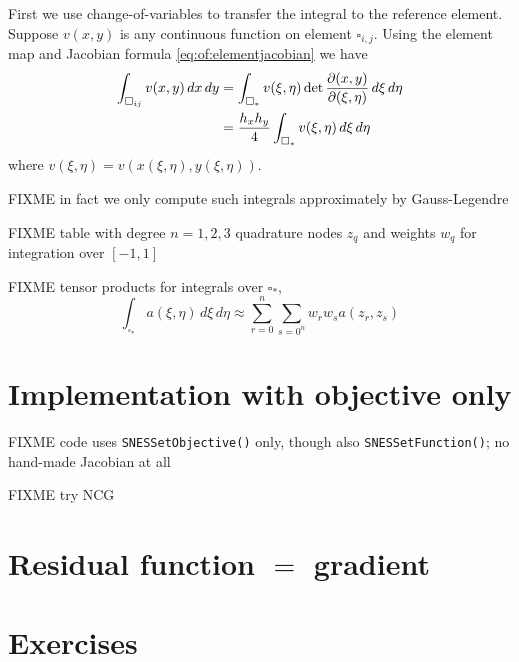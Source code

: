 First we use change-of-variables to transfer the integral to the reference element.  Suppose $v(x,y)$ is any continuous function on element $\square_{i,j}$.  Using the element map and Jacobian formula \eqref{eq:of:elementjacobian} we have
\begin{align}
\int_{\square_{ij}} v(x,y)\,dx\,dy &= \int_{\square_\ast} v(\xi,\eta) \det\frac{\partial(x,y)}{\partial(\xi,\eta)}\,d\xi\,d\eta  \label{eq:of:changeofvars} \\
&= \frac{h_x h_y}{4} \int_{\square_\ast} v(\xi,\eta) \,d\xi\,d\eta \notag
\end{align}
where $v(\xi,\eta)=v(x(\xi,\eta),y(\xi,\eta))$.

FIXME in fact we only compute such integrals approximately by Gauss-Legendre

FIXME table with degree $n=1,2,3$ quadrature nodes $z_q$ and weights $w_q$ for integration over $[-1,1]$

FIXME tensor products for integrals over $\square_\ast$,
    $$\int_{\square_\ast} a(\xi,\eta) \,d\xi\,d\eta \approx \sum_{r=0}^n \sum_{s=0^n} w_r w_s a(z_r,z_s)$$


\clearpage
\newpage
\section{Implementation with objective only}

FIXME code uses \texttt{SNESSetObjective()} only, though also \texttt{SNESSetFunction()}; no hand-made Jacobian at all

FIXME try NCG






\section{Residual function $=$ gradient}



\section{Exercises}

